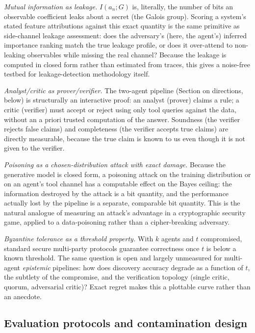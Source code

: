 \documentclass[10pt]{article}
\begin{document}
\emph{Mutual information as leakage.} $I(a_n; G)$ is, literally, the
number of bits an observable coefficient leaks about a secret (the
Galois group). Scoring a system's stated feature attributions against
this exact quantity is the same primitive as side-channel leakage
assessment: does the adversary's (here, the agent's) inferred
importance ranking match the true leakage profile, or does it
over-attend to non-leaking observables while missing the real channel?
Because the leakage is computed in closed form rather than estimated
from traces, this gives a noise-free testbed for leakage-detection
methodology itself.

\emph{Analyst/critic as prover/verifier.} The two-agent pipeline
(Section on directions, below) is structurally an interactive proof:
an analyst (prover) claims a rule; a critic (verifier) must accept or
reject using only tool queries against the data, without an a priori
trusted computation of the answer. Soundness (the verifier rejects
false claims) and completeness (the verifier accepts true claims) are
directly measurable, because the true claim is known to us even though
it is not given to the verifier.

\emph{Poisoning as a chosen-distribution attack with exact damage.}
Because the generative model is closed form, a poisoning attack on the
training distribution or on an agent's tool channel has a computable
effect on the Bayes ceiling: the information destroyed by the attack
is a bit quantity, and the performance actually lost by the pipeline
is a separate, comparable bit quantity. This is the natural analogue
of measuring an attack's advantage in a cryptographic security game,
applied to a data-poisoning rather than a cipher-breaking adversary.

\emph{Byzantine tolerance as a threshold property.} With $k$ agents and
$t$ compromised, standard secure multi-party protocols guarantee
correctness once $t$ is below a known threshold. The same question is
open and largely unmeasured for multi-agent \emph{epistemic} pipelines:
how does discovery accuracy degrade as a function of $t$, the
subtlety of the compromise, and the verification topology (single
critic, quorum, adversarial critic)? Exact regret makes this a
plottable curve rather than an anecdote.

\subsection*{Evaluation protocols and contamination design}
\end{document}
